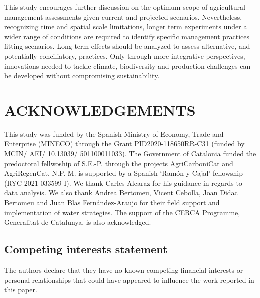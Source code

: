 This study encourages further discussion on the optimum scope of agricultural management assessments given current and projected scenarios. Nevertheless, recognizing time and spatial scale limitations, longer term experiments under a wider range of conditions are required to identify specific management practices fitting scenarios. Long term effects should be analyzed to assess alternative, and potentially conciliatory, practices. Only through more integrative perspectives, innovations needed to tackle climate, biodiversity and production challenges can be developed without compromising sustainability.\\

\section*{ACKNOWLEDGEMENTS}
\label{sec:ackn1}

This study was funded by the Spanish Ministry of Economy, Trade and Enterprise (MINECO) through the Grant PID2020-118650RR-C31 (funded by MCIN/ AEI/ 10.13039/ 501100011033). The Government of Catalonia funded the predoctoral fellwoship of S.E.-P. through the projects AgriCarboniCat and AgriRegenCat. N.P.-M. is supported by a Spanish ‘Ramón y Cajal’ fellowship (RYC-2021-033599-I). We thank Carles Alcaraz for his guidance in regards to data analysis. We also thank Andrea Bertomeu, Vicent Cebolla, Joan Didac Bertomeu and Juan Blas Fernández-Araujo for their field support and implementation of water strategies. The support of the CERCA Programme, Generalitat de Catalunya, is also acknowledged.

\subsection*{Competing interests statement}
\label{sec:interests1}

The authors declare that they have no known competing financial
interests or personal relationships that could have appeared to influence the work reported in this paper.

 

\pagebreak

%

